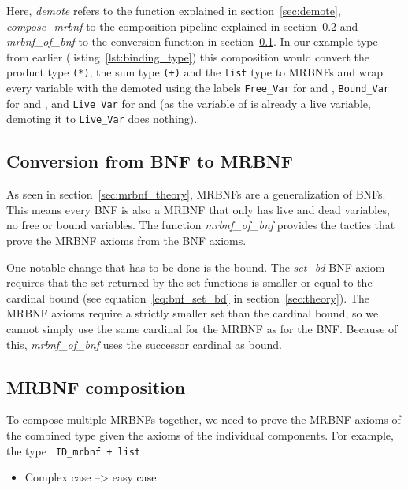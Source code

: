 Here, \textit{demote} refers to the function explained in section~\ref{sec:demote}, \textit{compose\_mrbnf} to the composition pipeline explained in section~\ref{sec:composition} and \textit{mrbnf\_of\_bnf} to the conversion function in section~\ref{sec:conversion}. In our example type from earlier (listing~\ref{lst:binding_type}) this composition would convert the product type \texttt{(*)}, the sum type \texttt{(+)} and the \texttt{list} type to \acp{MRBNF} and wrap every variable with the  demoted using the labels \texttt{Free\_Var} for  and , \texttt{Bound\_Var} for  and , and \texttt{Live\_Var} for  and  (as the variable of  is already a live variable, demoting it to \texttt{Live\_Var} does nothing).

\subsection{Conversion from BNF to MRBNF}\label{sec:conversion}

As seen in section~\ref{sec:mrbnf_theory}, \acp{MRBNF} are a generalization of \acp{BNF}. This means every \ac{BNF} is also a \ac{MRBNF} that only has live and dead variables, no free or bound variables. The function \textit{mrbnf\_of\_bnf} provides the tactics that prove the \ac{MRBNF} axioms from the \ac{BNF} axioms.

One notable change that has to be done is the bound. The \textit{set\_bd} \ac{BNF} axiom requires that the set returned by the set functions is smaller or equal to the cardinal bound (see equation~\ref{eq:bnf_set_bd} in section~\ref{sec:theory}). The \ac{MRBNF} axioms require a strictly smaller set than the cardinal bound, so we cannot simply use the same cardinal for the \ac{MRBNF} as for the \ac{BNF}. Because of this, \textit{mrbnf\_of\_bnf} uses the successor cardinal as bound.

\subsection{\ac{MRBNF} composition}\label{sec:composition}

To compose multiple \acp{MRBNF} together, we need to prove the \ac{MRBNF} axioms of the combined type given the axioms of the individual components. For example, the type \texttt{ ID\_mrbnf +  list}

\begin{itemize}
\item{Complex case --> easy case}
\end{itemize}


